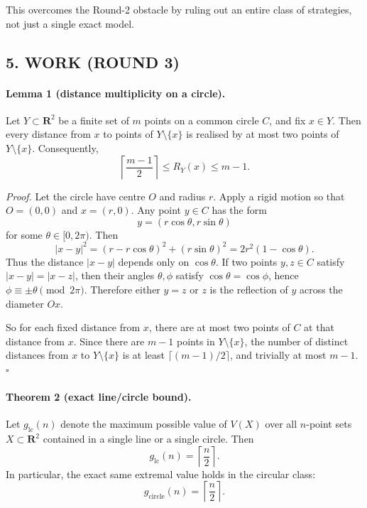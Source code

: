 This overcomes the Round-2 obstacle by ruling out an entire class of strategies, not just a single exact model.

\subsection*{5. WORK (ROUND 3)}

\paragraph{Lemma 1 (distance multiplicity on a circle).}
Let \(Y\subset \mathbf{R}^2\) be a finite set of \(m\) points on a common circle \(C\), and fix \(x\in Y\).  Then every distance from \(x\) to points of \(Y\setminus\{x\}\) is realised by at most two points of \(Y\setminus\{x\}\).
Consequently,
\[
\left\lceil\frac{m-1}{2}\right\rceil \le R_Y(x)\le m-1.
\]

\medskip
\noindent
\textit{Proof.}
Let the circle have centre \(O\) and radius \(r\).  Apply a rigid motion so that \(O=(0,0)\) and \(x=(r,0)\).  Any point \(y\in C\) has the form
\[
y=(r\cos\theta,r\sin\theta)
\]
for some \(\theta\in [0,2\pi)\).  Then
\[
|x-y|^2=(r-r\cos\theta)^2+(r\sin\theta)^2=2r^2(1-\cos\theta).
\]
Thus the distance \(|x-y|\) depends only on \(\cos\theta\).  If two points \(y,z\in C\) satisfy \(|x-y|=|x-z|\), then their angles \(\theta,\phi\) satisfy \(\cos\theta=\cos\phi\), hence \(\phi\equiv \pm \theta\pmod{2\pi}\).  Therefore either \(y=z\) or \(z\) is the reflection of \(y\) across the diameter \(Ox\).

So for each fixed distance from \(x\), there are at most two points of \(C\) at that distance from \(x\).  Since there are \(m-1\) points in \(Y\setminus\{x\}\), the number of distinct distances from \(x\) to \(Y\setminus\{x\}\) is at least \(\lceil (m-1)/2\rceil\), and trivially at most \(m-1\).  \hfill\(\square\)

\paragraph{Theorem 2 (exact line/circle bound).}
Let \(g_{\mathrm{lc}}(n)\) denote the maximum possible value of \(V(X)\) over all \(n\)-point sets \(X\subset \mathbf{R}^2\) contained in a single line or a single circle.  Then
\[
 g_{\mathrm{lc}}(n)=\left\lceil\frac{n}{2}\right\rceil.
\]
In particular, the exact same extremal value holds in the circular class:
\[
 g_{\mathrm{circle}}(n)=\left\lceil\frac{n}{2}\right\rceil.
\]

